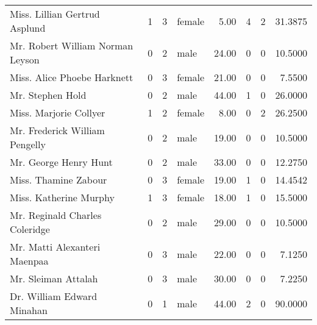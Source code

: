\begin{tabular}{lrrlrrrr}
Miss. Lillian Gertrud Asplund                      &         1 &       3 &  female &   5.00 &                        4 &                        2 &   31.3875 \\
Mr. Robert William Norman Leyson                   &         0 &       2 &    male &  24.00 &                        0 &                        0 &   10.5000 \\
Miss. Alice Phoebe Harknett                        &         0 &       3 &  female &  21.00 &                        0 &                        0 &    7.5500 \\
Mr. Stephen Hold                                   &         0 &       2 &    male &  44.00 &                        1 &                        0 &   26.0000 \\
Miss. Marjorie Collyer                             &         1 &       2 &  female &   8.00 &                        0 &                        2 &   26.2500 \\
Mr. Frederick William Pengelly                     &         0 &       2 &    male &  19.00 &                        0 &                        0 &   10.5000 \\
Mr. George Henry Hunt                              &         0 &       2 &    male &  33.00 &                        0 &                        0 &   12.2750 \\
Miss. Thamine Zabour                               &         0 &       3 &  female &  19.00 &                        1 &                        0 &   14.4542 \\
Miss. Katherine Murphy                             &         1 &       3 &  female &  18.00 &                        1 &                        0 &   15.5000 \\
Mr. Reginald Charles Coleridge                     &         0 &       2 &    male &  29.00 &                        0 &                        0 &   10.5000 \\
Mr. Matti Alexanteri Maenpaa                       &         0 &       3 &    male &  22.00 &                        0 &                        0 &    7.1250 \\
Mr. Sleiman Attalah                                &         0 &       3 &    male &  30.00 &                        0 &                        0 &    7.2250 \\
Dr. William Edward Minahan                         &         0 &       1 &    male &  44.00 &                        2 &                        0 &   90.0000 \\

\end{tabular}
